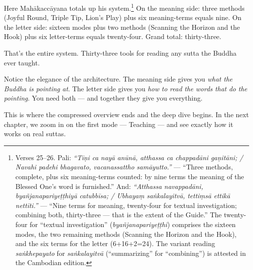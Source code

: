 Here Mahākaccāyana totals up his system.\footnote{Verses 25--26. Pali: \textit{``Tīṇi ca nayā anūnā, atthassa ca chappadāni gaṇitāni; / Navahi padehi bhagavato, vacanassattho samāyutto.''} --- ``Three methods, complete, plus six meaning-terms counted: by nine terms the meaning of the Blessed One's word is furnished.'' And: \textit{``Atthassa navappadāni, byañjanapariyeṭṭhiyā catubbīsa; / Ubhayaṃ saṅkalayitvā, tettiṃsā ettikā nettīti.''} --- ``Nine terms for meaning, twenty-four for textual investigation; combining both, thirty-three --- that is the extent of the Guide.'' The twenty-four for ``textual investigation'' (\textit{byañjanapariyeṭṭhi}) comprises the sixteen modes, the two remaining methods (Scanning the Horizon and the Hook), and the six terms for the letter (6+16+2=24). The variant reading \textit{saṅkhepayato} for \textit{saṅkalayitvā} (``summarizing'' for ``combining'') is attested in the Cambodian edition.} On the meaning side: three methods (Joyful Round, Triple Tip, Lion's Play) plus six meaning-terms equals nine. On the letter side: sixteen modes plus two methods (Scanning the Horizon and the Hook) plus six letter-terms equals twenty-four. Grand total: thirty-three.

That's the entire system. Thirty-three tools for reading any sutta the Buddha ever taught.

\bigskip

Notice the elegance of the architecture. The meaning side gives you \textit{what the Buddha is pointing at}. The letter side gives you \textit{how to read the words that do the pointing}. You need both --- and together they give you everything.

This is where the compressed overview ends and the deep dive begins. In the next chapter, we zoom in on the first mode --- Teaching --- and see exactly how it works on real suttas.
